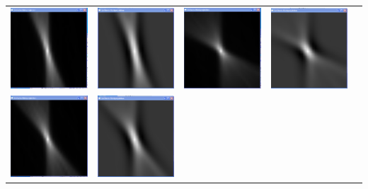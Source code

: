 \begin{longtable}{p{3cm}p{3cm}p{3cm}p{3cm}c}
                  \includegraphics[width=.2\textwidth, height=0.125\textheight]{pic/Einzelfenster_Bilder/inhomogene_Messung/inhomo2einf_rueckprj.png}
                  & 
                  \includegraphics[width=.2\textwidth, height=0.125\textheight]{pic/Einzelfenster_Bilder/inhomogene_Messung/inhomo2gef_prj.png}
                  &
                  \includegraphics[width=.2\textwidth, height=0.125\textheight]{pic/Einzelfenster_Bilder/isotrope_Messung/iso2einf_rueckprj.png}
                  & 
                  \includegraphics[width=.2\textwidth, height=0.125\textheight]{pic/Einzelfenster_Bilder/isotrope_Messung/iso2gef_prj.png}\\
                  \includegraphics[width=.2\textwidth, height=0.125\textheight]{pic/Einzelfenster_Bilder/inhomogene_Messung/inhomo3einf_rueckprj.png}
                  & 
                  \includegraphics[width=.2\textwidth, height=0.125\textheight]{pic/Einzelfenster_Bilder/inhomogene_Messung/inhomo3gef_prj.png}

\end{longtable}
